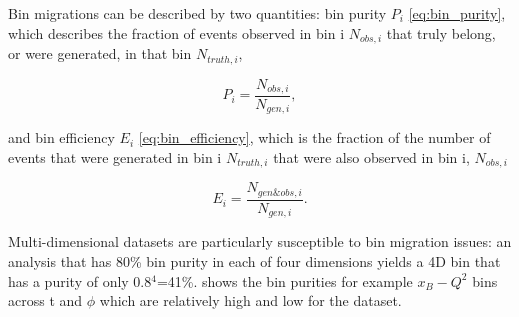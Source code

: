 Bin migrations can be described by two quantities: bin purity $P_{i}$ \eqref{eq:bin_purity}, which describes the fraction of events observed in bin i $N_{obs,i}$ that truly belong, or were generated, in that bin $N_{truth,i}$, 

    \begin{equation}
    P_{i} = \frac{N_{obs,i}}{N_{gen,i}},
    \end{equation}\label{eq:bin_purity}

    and bin efficiency  $E_{i}$ \eqref{eq:bin_efficiency}, which is the fraction of the number of events that were generated in bin i $N_{truth,i}$ that were also observed in bin i, $N_{obs,i}$ 

    \begin{equation}\label{eq:bin_efficiency}
    E_{i} = \frac{N_{gen\&obs,i}}{N_{gen,i}}.
    \end{equation}

Multi-dimensional datasets are particularly susceptible to bin migration issues: an analysis that has 80\% bin purity in each of four dimensions yields a 4D bin that has a purity of only 0.8$^4$=41\%.  shows the bin purities for example $x_B-Q^2$ bins across t and $\phi$ which are relatively high and low for the dataset. 
    

